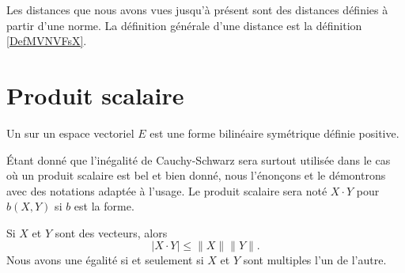 Les distances que nous avons vues jusqu'à présent sont des distances définies à partir d'une norme. La définition générale d'une distance est la définition \ref{DefMVNVFsX}.

\section{Produit scalaire}

\begin{definition}\label{DefVJIeTFj}
    Un  sur un espace vectoriel \( E\) est une forme bilinéaire symétrique définie positive.
\end{definition}

Étant donné que l'inégalité de Cauchy-Schwarz sera surtout utilisée dans le cas où un produit scalaire est bel et bien donné, nous l'énonçons et le démontrons avec des notations adaptée à l'usage. Le produit scalaire sera noté \( X\cdot Y\) pour \( b(X,Y)\) si \( b\) est la forme.
\begin{theorem}      \label{ThoAYfEHG}
	Si $X$ et $Y$ sont des vecteurs, alors
	\begin{equation}
		| X\cdot Y |\leq\| X \|\| Y \|.
	\end{equation}
    Nous avons une égalité si et seulement si \( X\) et \( Y\) sont multiples l'un de l'autre.
\end{theorem}

